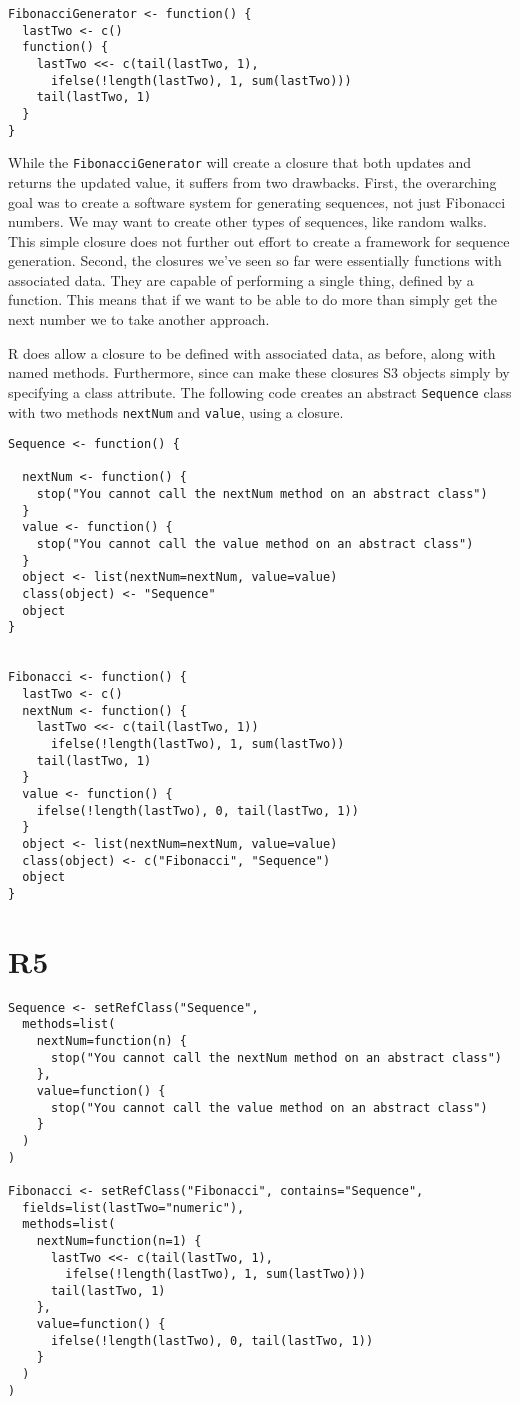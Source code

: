 \begin{verbatim}
FibonacciGenerator <- function() {
  lastTwo <- c()
  function() {
    lastTwo <<- c(tail(lastTwo, 1),
      ifelse(!length(lastTwo), 1, sum(lastTwo)))
    tail(lastTwo, 1)
  }
}
\end{verbatim}

While the \texttt{FibonacciGenerator} will create a closure that both
updates and returns the updated value, it suffers from two drawbacks.
First, the overarching goal was to create a software system for
generating sequences, not just Fibonacci numbers. We may want to create
other types of sequences, like random walks. This simple closure does
not further out effort to create a framework for sequence generation.
Second, the closures we've seen so far were essentially functions with
associated data. They are capable of performing a single thing, defined
by a function. This means that if we want to be able to do more than
simply get the next number we to take another approach.

R does allow a closure to be defined with associated data, as before,
along with named methods. Furthermore, since can make these closures S3
objects simply by specifying a class attribute. The following code
creates an abstract \texttt{Sequence} class with two methods
\texttt{nextNum} and \texttt{value}, using a closure.

\begin{verbatim}
Sequence <- function() {

  nextNum <- function() {
    stop("You cannot call the nextNum method on an abstract class")
  }
  value <- function() {
    stop("You cannot call the value method on an abstract class")
  }
  object <- list(nextNum=nextNum, value=value)
  class(object) <- "Sequence"
  object
}


Fibonacci <- function() {
  lastTwo <- c()
  nextNum <- function() {
    lastTwo <<- c(tail(lastTwo, 1))
      ifelse(!length(lastTwo), 1, sum(lastTwo))
    tail(lastTwo, 1)
  }
  value <- function() {
    ifelse(!length(lastTwo), 0, tail(lastTwo, 1))
  }
  object <- list(nextNum=nextNum, value=value)
  class(object) <- c("Fibonacci", "Sequence")
  object
}
\end{verbatim}

\hypertarget{r5}{%
\section{R5}\label{r5}}

\begin{verbatim}
Sequence <- setRefClass("Sequence",
  methods=list(
    nextNum=function(n) {
      stop("You cannot call the nextNum method on an abstract class")
    },
    value=function() {
      stop("You cannot call the value method on an abstract class")
    }
  )
)

Fibonacci <- setRefClass("Fibonacci", contains="Sequence",
  fields=list(lastTwo="numeric"),
  methods=list(
    nextNum=function(n=1) {
      lastTwo <<- c(tail(lastTwo, 1),
        ifelse(!length(lastTwo), 1, sum(lastTwo)))
      tail(lastTwo, 1)
    },
    value=function() {
      ifelse(!length(lastTwo), 0, tail(lastTwo, 1))
    }
  )
)
\end{verbatim}
